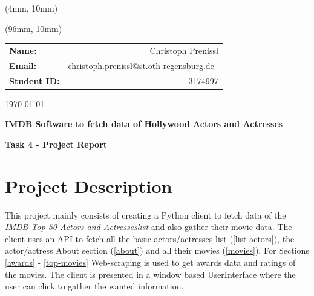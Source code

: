 \documentclass[12pt]{article}
\author{Christoph Prenissl}
\date{\today}
\begin{document}
\begin{titlepage}

      \begin{textblock*}{200mm}(4mm, 10mm)
            \begin{figure}
                  \def\svgscale{0.6}
                  
            \end{figure}
      \end{textblock*}

      \begin{textblock*}{200mm}(96mm, 10mm)
            \begin{tabular}[h]{lr}
                  \textbf{Name:}       & Christoph Prenissl                                                                              \\
                  \textbf{Email:}      & \href{mailto:christoph.prenissl@st.oth-regensburg.de}{christoph.prenissl@st.oth-regensburg.de}\ \\
                  \textbf{Student ID:} & 3174997                                                                                         \\
            \end{tabular}
      \end{textblock*}

      \begin{flushright}
            \today
      \end{flushright}

      \vspace{2cm}

      \begin{center}
            \textbf{\Large{IMDB Software to fetch data of Hollywood Actors and Actresses}}

            \vspace{6cm}

            \textbf{Task 4 - Project Report}

            \vspace{10cm}
      \end{center}
\end{titlepage}

\newpage

\tableofcontents

\newpage

\section{Project Description}
This project mainly consists of creating a Python client to fetch data of the 
\textit{IMDB Top 50 Actors and Actresseslist} and also gather their movie data. 
The client uses an API to fetch all the basic actors/actresses list (\ref{list-actors}),
the actor/actress About section (\ref{about}) and all their movies (\ref{movies}).
For Sections \ref{awards} - \ref{top-movies} Web-scraping is used to 
get awards data and ratings of the movies.
The client is presented in a window based UserInterface where the user 
can click to gather the wanted information.
\end{document}
